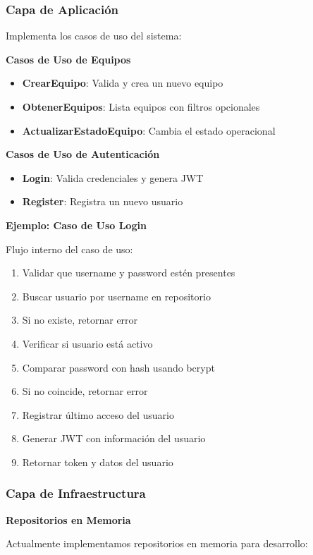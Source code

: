 \documentclass[12pt,a4paper]{article}
\begin{document}
\subsubsection{Capa de Aplicación}

Implementa los casos de uso del sistema:

\textbf{Casos de Uso de Equipos}
\begin{itemize}
    \item \textbf{CrearEquipo}: Valida y crea un nuevo equipo
    \item \textbf{ObtenerEquipos}: Lista equipos con filtros opcionales
    \item \textbf{ActualizarEstadoEquipo}: Cambia el estado operacional
\end{itemize}

\textbf{Casos de Uso de Autenticación}
\begin{itemize}
    \item \textbf{Login}: Valida credenciales y genera JWT
    \item \textbf{Register}: Registra un nuevo usuario
\end{itemize}

\textbf{Ejemplo: Caso de Uso Login}

Flujo interno del caso de uso:
\begin{enumerate}
    \item Validar que username y password estén presentes
    \item Buscar usuario por username en repositorio
    \item Si no existe, retornar error
    \item Verificar si usuario está activo
    \item Comparar password con hash usando bcrypt
    \item Si no coincide, retornar error
    \item Registrar último acceso del usuario
    \item Generar JWT con información del usuario
    \item Retornar token y datos del usuario
\end{enumerate}

\subsubsection{Capa de Infraestructura}

\textbf{Repositorios en Memoria}

Actualmente implementamos repositorios en memoria para desarrollo:
\end{document}
